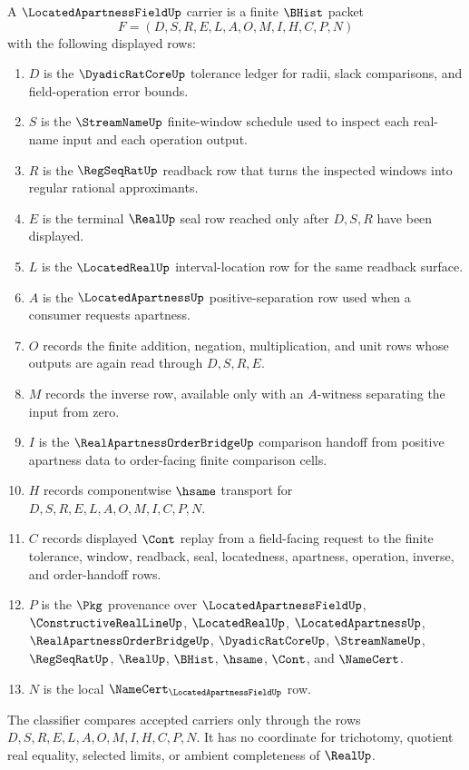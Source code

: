 \begin{definition}
\label{def:located-apartness-field-carrier}
A $\LocatedApartnessFieldUp$ carrier is a finite $\BHist$ packet
$$
F=(D,S,R,E,L,A,O,M,I,H,C,P,N)
$$
with the following displayed rows:
\begin{enumerate}
\item $D$ is the $\DyadicRatCoreUp$ tolerance ledger for radii, slack comparisons, and field-operation error bounds.
\item $S$ is the $\StreamNameUp$ finite-window schedule used to inspect each real-name input and each operation output.
\item $R$ is the $\RegSeqRatUp$ readback row that turns the inspected windows into regular rational approximants.
\item $E$ is the terminal $\RealUp$ seal row reached only after $D,S,R$ have been displayed.
\item $L$ is the $\LocatedRealUp$ interval-location row for the same readback surface.
\item $A$ is the $\LocatedApartnessUp$ positive-separation row used when a consumer requests apartness.
\item $O$ records the finite addition, negation, multiplication, and unit rows whose outputs are again read through $D,S,R,E$.
\item $M$ records the inverse row, available only with an $A$-witness separating the input from zero.
\item $I$ is the $\RealApartnessOrderBridgeUp$ comparison handoff from positive apartness data to order-facing finite comparison cells.
\item $H$ records componentwise $\hsame$ transport for $D,S,R,E,L,A,O,M,I,C,P,N$.
\item $C$ records displayed $\Cont$ replay from a field-facing request to the finite tolerance, window, readback, seal, locatedness, apartness, operation, inverse, and order-handoff rows.
\item $P$ is the $\Pkg$ provenance over $\LocatedApartnessFieldUp$, $\ConstructiveRealLineUp$, $\LocatedRealUp$, $\LocatedApartnessUp$, $\RealApartnessOrderBridgeUp$, $\DyadicRatCoreUp$, $\StreamNameUp$, $\RegSeqRatUp$, $\RealUp$, $\BHist$, $\hsame$, $\Cont$, and $\NameCert$.
\item $N$ is the local $\NameCert_{\LocatedApartnessFieldUp}$ row.
\end{enumerate}
The classifier compares accepted carriers only through the rows $D,S,R,E,L,A,O,M,I,H,C,P,N$. It has no coordinate for trichotomy, quotient real equality, selected limits, or ambient completeness of $\RealUp$.
\end{definition}

